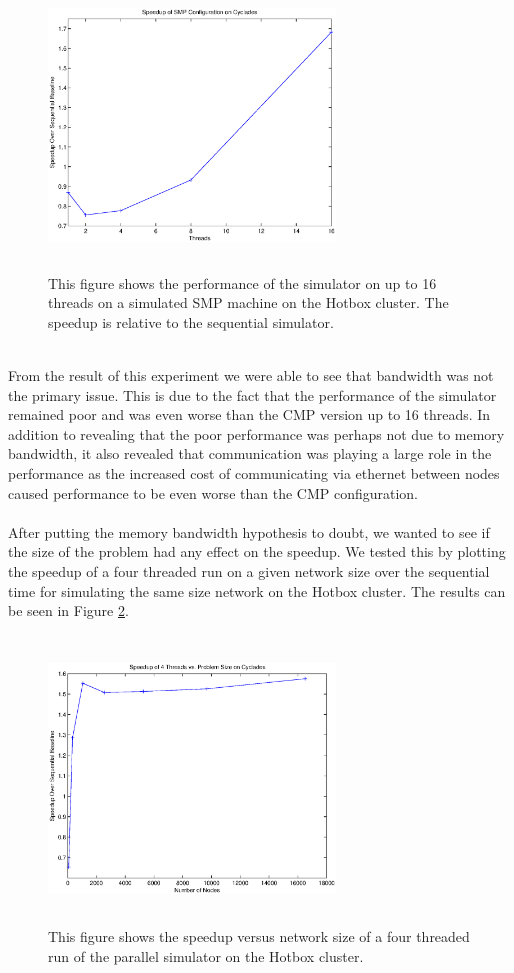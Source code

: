 \documentclass[twocolumn]{article}
\begin{document}
\begin{figure}[h]
\centering
\includegraphics[height=3in,width=3in]{smp.eps}
\caption{\label{smp}This figure shows the performance of the simulator on
up to 16 threads on a simulated SMP machine on the Hotbox cluster.  The speedup is relative to
the sequential simulator.}
\end{figure}
~\\
From the result of this experiment we were able to see that bandwidth was
not the primary issue.  This is due to the fact that the performance of
the simulator remained poor and was even worse than the CMP version up to
16 threads.  In addition to revealing that the poor performance was perhaps not
due to memory bandwidth, it also revealed that communication was playing a
large role in the performance as the increased cost of communicating via
ethernet between nodes caused performance to be even worse than the CMP
configuration.\\
~\\
After putting the memory bandwidth hypothesis to doubt, we wanted to see if
the size of the problem had any effect on the speedup.  We tested this by
plotting the speedup of a four threaded run on a given network size over the
sequential time for simulating the same size network on the Hotbox
cluster.  The results can be seen in Figure \ref{probsize}.
\begin{figure}[h]
\centering
\includegraphics[height=3in,width=3in]{probsize.eps}
\caption{\label{probsize}This figure shows the speedup versus network size of a
four threaded run of the parallel simulator on the Hotbox cluster.}
\end{figure}
\end{document}
